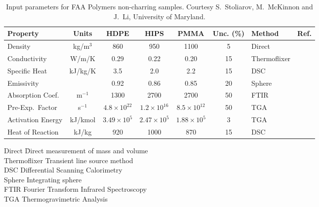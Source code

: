 \begin{table}[h!]
\caption[FAA non-charring polymer properties.]{Input parameters for FAA Polymers non-charring samples. Courtesy S.~Stoliarov, M.~McKinnon and J.~Li, University of Maryland.}
\begin{tabular}{|l|c|c|c|c|c|l|l|}
\hline
Property                    & Units         & HDPE                  & HIPS                  & PMMA                  & Unc. (\%)  & Method                &  Ref.                    \\ \hline \hline
Density                     & kg/m$^3$      & 860                   & 950                   & 1100                  & 5     & Direct                &  \cite{Stoliarov:CF2009}  \\ \hline
Conductivity                & W/m/K         & 0.29                  & 0.22                  & 0.20                  & 15    & Thermoflixer          &  \cite{Stoliarov:CF2009}  \\ \hline
Specific Heat               & kJ/kg/K       & 3.5                   & 2.0                   & 2.2                   & 15    & DSC                   &  \cite{Stoliarov:PDS2008}  \\ \hline
Emissivity                  &               & 0.92                  & 0.86                  & 0.85                  & 20    & Sphere                &  \cite{Hallman:PES1974}  \\ \hline
Absorption Coef.            & m$^{-1}$      & 1300                  & 2700                  & 2700                  & 50    & FTIR                  &  \cite{Tsilingiris:ECM2003}  \\ \hline
Pre-Exp.~Factor             & s$^{-1}$      & $4.8 \times 10^{22}$  & $1.2 \times 10^{16}$  & $8.5 \times 10^{12}$  & 50    & TGA                   &  \cite{Stoliarov:CF2009}  \\ \hline
Activation Energy           & kJ/kmol       & $3.49 \times 10^{5}$  & $2.47 \times 10^{5}$  & $1.88 \times 10^{5}$  & 3     & TGA                   &  \cite{Stoliarov:CF2009}  \\ \hline
Heat of Reaction            & kJ/kg         & 920                   & 1000                  & 870                   & 15    & DSC                   &  \cite{Stoliarov:PDS2008}  \\ \hline
\end{tabular}
\label{FAA_Properties}
\end{table}

\begin{tabbing}
Direct  \hspace{0.5in}     \= Direct measurement of mass and volume \\
Thermoflixer               \> Transient line source method \\
DSC                        \> Differential Scanning Calorimetry \\
Sphere                     \> Integrating sphere \\
FTIR                       \> Fourier Transform Infrared Spectroscopy \\
TGA                        \> Thermogravimetric Analysis
\end{tabbing}



